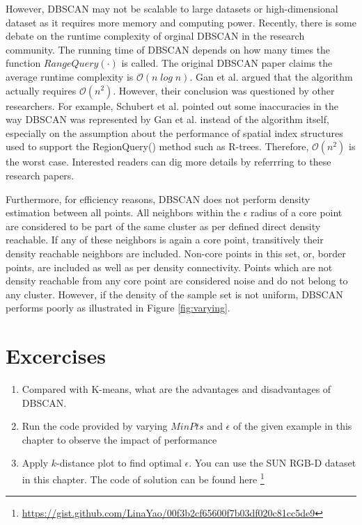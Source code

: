 However, DBSCAN may not be scalable to large datasets or 
high-dimensional dataset as it requires more memory and computing power. 
Recently, there is some debate on the runtime complexity of orginal DBSCAN in the
research community. The running time of DBSCAN depends on how many times the function
$RangeQuery(\cdot)$ is called. The original DBSCAN paper claims the average runtime 
complexity is 
$\mathit{\mathcal{O}(n \log n)}$. Gan et al. \cite{gan2015dbscan} argued that the algorithm actually requires $\mathcal{O}(n^{2})$.  However, their conclusion was questioned by other researchers. For example, Schubert et al. \cite{schubert2017dbscan} pointed out some inaccuracies in the way DBSCAN was represented by Gan et al. \cite{gan2015dbscan} instead of the algorithm itself, especially on the assumption about the performance of spatial index structures used to support the RegionQuery() method such as R-trees. Therefore, $\mathcal{O}(n^{2})$ is the worst case. Interested readers can dig more details by referrring to these 
research papers.  


Furthermore, for efficiency reasons, DBSCAN does not perform density estimation between 
all points. All neighbors within the $\epsilon$ radius of a core point are 
considered to be part of the same cluster as per defined direct density reachable.
If any of these neighbors is again a core point, transitively 
their density reachable neighbors are included. Non-core 
points in this set, or,
border points, are included as well as per density connectivity. 
Points which are not density reachable from
any core point are considered noise and do not belong to any cluster. However, 
if the density of the sample set is not uniform, DBSCAN performs poorly as illustrated in Figure \ref{fig:varying}. 

\section{Excercises}

\begin{enumerate}

\item Compared with K-means, what are the advantages and disadvantages of DBSCAN. 

\item Run the code provided by varying $MinPts$ and $\epsilon$ of the given example in this chapter to observe the impact of performance

\item Apply $k$-distance plot to find optimal $\epsilon$. You can use the SUN RGB-D dataset in this chapter. The code of solution can be found here \footnote{\url{https://gist.github.com/LinaYao/00f3b2cf65600f7b03df020c81cc5de9}}


\end{enumerate}




